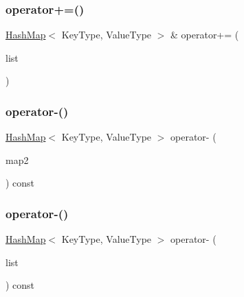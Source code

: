 \mbox{\label{classHashMap_a600a652110f7aeece4551dfe39f91bae}} 
\subsubsection{\texorpdfstring{operator+=()}{operator+=()}\hspace{0.1cm}{\footnotesize\ttfamily [2/2]}}
{\footnotesize\ttfamily \mbox{\hyperlink{classHashMap}{Hash\+Map}}$<$ Key\+Type, Value\+Type $>$ \& operator+= (\begin{DoxyParamCaption}\item[{std\+::initializer\+\_\+list$<$ std\+::pair$<$ Key\+Type, Value\+Type $>$ $>$}]{list }\end{DoxyParamCaption})}

\mbox{\label{classHashMap_a19a5b1e806f70ded0ad8c8405cb76827}} 
\subsubsection{\texorpdfstring{operator-\/()}{operator-()}\hspace{0.1cm}{\footnotesize\ttfamily [1/2]}}
{\footnotesize\ttfamily \mbox{\hyperlink{classHashMap}{Hash\+Map}}$<$ Key\+Type, Value\+Type $>$ operator-\/ (\begin{DoxyParamCaption}\item[{const \mbox{\hyperlink{classHashMap}{Hash\+Map}}$<$ Key\+Type, Value\+Type $>$ \&}]{map2 }\end{DoxyParamCaption}) const}

\mbox{\label{classHashMap_a2f7fc75dfe5f81887e45024b6b22b07a}} 
\subsubsection{\texorpdfstring{operator-\/()}{operator-()}\hspace{0.1cm}{\footnotesize\ttfamily [2/2]}}
{\footnotesize\ttfamily \mbox{\hyperlink{classHashMap}{Hash\+Map}}$<$ Key\+Type, Value\+Type $>$ operator-\/ (\begin{DoxyParamCaption}\item[{std\+::initializer\+\_\+list$<$ std\+::pair$<$ Key\+Type, Value\+Type $>$ $>$}]{list }\end{DoxyParamCaption}) const}

